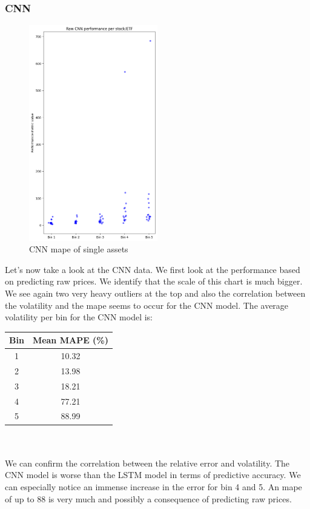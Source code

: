 \documentclass[a4paper,12pt]{report}
\begin{document}
		\subsubsection*{CNN}
\begin{figure}
  \includegraphics[width=0.5\textwidth]{images/results_CNN.png}
  \caption{CNN mape of single assets}
  \label{fig:wrapped}
\end{figure}

	
	Let’s now take a look at the CNN data. We first look at the performance based on predicting raw prices. We identify that the scale of this chart is much bigger. We see again two very heavy outliers at the top and also the correlation between the volatility and the mape seems to occur for the CNN model. The average volatility per bin for the CNN model is:
	\begin{tabular}{|c|c|}
  \hline
  \textbf{Bin} & \textbf{Mean MAPE (\%)} \\
  \hline
  1 & 10.32 \\
  2 & 13.98 \\
  3 & 18.21 \\
  4 & 77.21 \\
  5 & 88.99 \\
  \hline
\end{tabular}\\\\

	
	We can confirm the correlation between the relative error and volatility. The CNN model is worse than the LSTM model in terms of predictive accuracy. We can especially notice an immense increase in the error for bin 4 and 5. An mape of up to 88 is very much and possibly a consequence of predicting raw prices. \\
	
\end{document}
